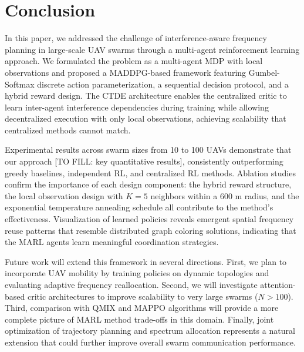 \documentclass[conference]{IEEEtran}
\begin{document}
\section{Conclusion}

In this paper, we addressed the challenge of interference-aware frequency planning in large-scale UAV swarms through a multi-agent reinforcement learning approach. We formulated the problem as a multi-agent MDP with local observations and proposed a MADDPG-based framework featuring Gumbel-Softmax discrete action parameterization, a sequential decision protocol, and a hybrid reward design. The CTDE architecture enables the centralized critic to learn inter-agent interference dependencies during training while allowing decentralized execution with only local observations, achieving scalability that centralized methods cannot match.

Experimental results across swarm sizes from 10 to 100 UAVs demonstrate that our approach [TO FILL: key quantitative results], consistently outperforming greedy baselines, independent RL, and centralized RL methods. Ablation studies confirm the importance of each design component: the hybrid reward structure, the local observation design with $K=5$ neighbors within a 600 m radius, and the exponential temperature annealing schedule all contribute to the method's effectiveness. Visualization of learned policies reveals emergent spatial frequency reuse patterns that resemble distributed graph coloring solutions, indicating that the MARL agents learn meaningful coordination strategies.

Future work will extend this framework in several directions. First, we plan to incorporate UAV mobility by training policies on dynamic topologies and evaluating adaptive frequency reallocation. Second, we will investigate attention-based critic architectures to improve scalability to very large swarms ($N > 100$). Third, comparison with QMIX and MAPPO algorithms will provide a more complete picture of MARL method trade-offs in this domain. Finally, joint optimization of trajectory planning and spectrum allocation represents a natural extension that could further improve overall swarm communication performance.

\vspace{12pt}
\end{document}
